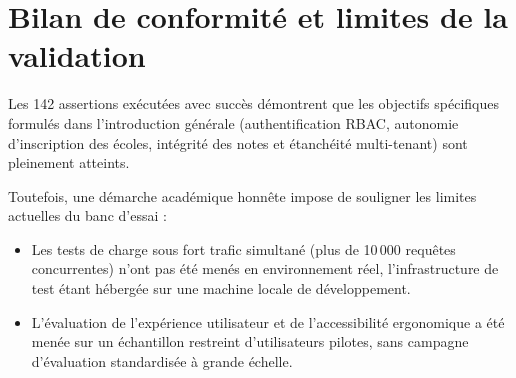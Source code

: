 \section{Bilan de conformité et limites de la validation}

Les 142 assertions exécutées avec succès démontrent que les objectifs spécifiques formulés dans l'introduction générale (authentification RBAC, autonomie d'inscription des écoles, intégrité des notes et étanchéité multi-tenant) sont pleinement atteints.

Toutefois, une démarche académique honnête impose de souligner les limites actuelles du banc d'essai :
\begin{itemize}
    \item Les tests de charge sous fort trafic simultané (plus de 10\,000 requêtes concurrentes) n'ont pas été menés en environnement réel, l'infrastructure de test étant hébergée sur une machine locale de développement.
    \item L'évaluation de l'expérience utilisateur et de l'accessibilité ergonomique a été menée sur un échantillon restreint d'utilisateurs pilotes, sans campagne d'évaluation standardisée à grande échelle.
\end{itemize}
